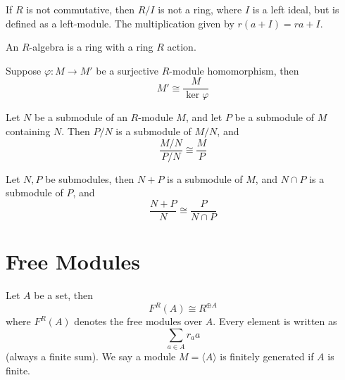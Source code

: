 \documentclass[openany]{book}
\newcommand{\la}{\langle}
\newcommand{\ra}{\rangle}
\begin{document}
\begin{example}
    If $R$ is not commutative, then $R/I$ is not a ring, where $I$ is a left ideal, but is defined as a left-module. The multiplication given by $r(a+I)=ra+I$.
\end{example}





\begin{defn}
    An $R$-algebra is a ring with a ring $R$ action.
\end{defn}

\begin{thm}
    Suppose $\varphi: M\to M'$ be a surjective $R$-module homomorphism, then 
    \begin{equation*}
        M'\cong\frac{M}{\ker\varphi}
    \end{equation*}
\end{thm}

\begin{prop}
    Let $N$ be a submodule of an $R$-module $M$, and let $P$ be a submodule of $M$ containing $N$. Then $P/N$ is a submodule of $M/N$, and 
    \begin{equation*}
        \frac{M/N}{P/N}\cong\frac{M}{P}
    \end{equation*}
\end{prop}

\begin{prop}
    Let $N,P$ be submodules, then $N+P$ is a submodule of $M$, and $N\cap P$ is a submodule of $P$, and 
    \begin{equation*}
        \frac{N+P}{N}\cong\frac{P}{N\cap P}
    \end{equation*}
\end{prop}


\section{Free Modules}

\begin{defn}
    Let $A$ be a set, then 
    \begin{equation*}
        F^R(A)\cong R^{\oplus A}
    \end{equation*}
    where $F^R(A)$ denotes the free modules over $A$. Every element is written as 
    \begin{equation*}
        \sum_{a\in A}r_aa
    \end{equation*}
    (always a finite sum). We say a module $M=\la A\ra$ is finitely generated if $A$ is finite.
\end{defn}
\end{document}
